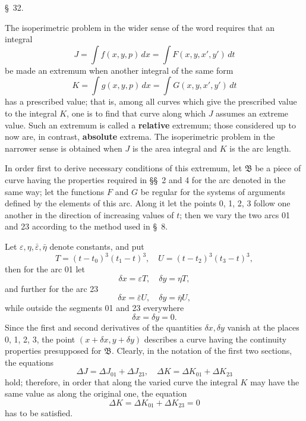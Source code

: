 \documentclass[11pt,a4paper,leqno]{article}
\begin{document}
\begin{center}{\large \S~32.}\end{center}

The isoperimetric problem in the wider sense of the word requires that an integral
\[
J=\int f(x,y,p)\,dx=\int F(x,y,x',y')\,dt
\]
be made an extremum when another integral of the same form
\[
K=\int g(x,y,p)\,dx=\int G(x,y,x',y')\,dt
\]
has a prescribed value; that is, among all curves which give the prescribed value to the integral $K$, one is to find that curve along which $J$ assumes an extreme value. Such an extremum is called a \textbf{relative} extremum; those considered up to now are, in contrast, \textbf{absolute} extrema. The isoperimetric problem in the narrower sense is obtained when $J$ is the area integral and $K$ is the arc length.

In order first to derive necessary conditions of this extremum, let $\mathfrak{B}$ be a piece of curve having the properties required in \S\S~2 and 4 for the arc denoted in the same way; let the functions $F$ and $G$ be regular for the systems of arguments defined by the elements of this arc. Along it let the points 0, 1, 2, 3 follow one another in the direction of increasing values of $t$; then we vary the two arcs 01 and 23 according to the method used in \S~8.

Let $\varepsilon,\eta,\bar\varepsilon,\bar\eta$ denote constants, and put
\[
T=(t-t_0)^3(t_1-t)^3,
\quad
U=(t-t_2)^3(t_3-t)^3,
\]
then for the arc 01 let
\[
\delta x=\varepsilon T,
\quad
\delta y=\eta T,
\]
and further for the arc 23
\[
\delta x=\bar\varepsilon U,
\quad
\delta y=\bar\eta U,
\]
while outside the segments 01 and 23 everywhere
\[
\delta x=\delta y=0.
\]
Since the first and second derivatives of the quantities $\delta x,\delta y$ vanish at the places 0, 1, 2, 3, the point $(x+\delta x,y+\delta y)$ describes a curve having the continuity properties presupposed for $\mathfrak{B}$. Clearly, in the notation of the first two sections, the equations
\begin{equation}\tag{1}
\Delta J=\Delta J_{01}+\Delta J_{23},
\quad
\Delta K=\Delta K_{01}+\Delta K_{23}
\end{equation}
hold; therefore, in order that along the varied curve the integral $K$ may have the same value as along the original one, the equation
\[
\Delta K=\Delta K_{01}+\Delta K_{23}=0
\]
has to be satisfied.
\end{document}
